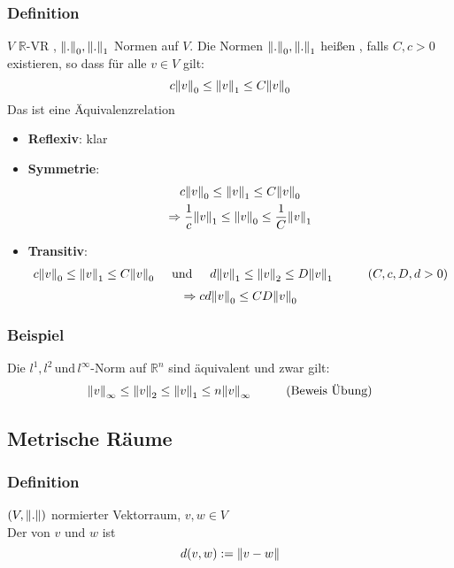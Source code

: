 \subsubsection[Äquivalenz von Normen]{Definition} %
\label{ssub:definition}
$ V$ $\mathbb{R}$-VR , $\norm{.}_0 , \norm{.}_1$ Normen auf $ V$. Die Normen $\norm{.}_0 , \norm{.}_1$ heißen , falls $C,c>0$ existieren, so dass für alle $v \in  V$ gilt:
\[
	c \norm{v}_0 \leq \norm{v}_1 \leq C \norm{v}_0 
\] 
 Das ist eine Äquivalenzrelation
\begin{itemize}
	\item { \bfseries Reflexiv}: klar
	\item { \bfseries Symmetrie}: \begin{gather*}
		c \norm{v}_0 \leq \norm{v}_1 \leq C \norm{v}_0 \\
		\Rightarrow \frac{1}{c} \norm{v}_1 \leq \norm{v}_0 \leq \frac{1}{C} \norm{v}_1
	\end{gather*}
	\item {\bfseries Transitiv}: \begin{gather*}
		c \norm{v}_0 \leq \norm{v}_1 \leq C \norm{v}_0 \hspace{0.5cm} \text{und}\hspace{0.5cm} d \norm{v}_1 \leq \norm{v}_2 \leq D \norm{v}_1  \hspace{1cm} (C,c,D,d > 0)	\end{gather*}
		\[
		\Rightarrow cd \norm{v}_0 \leq CD \norm{v}_0
		\]
\end{itemize}

\subsubsection[Beispiel Äquivalente Normen]{Beispiel} %
\label{ssub:beispiel}
Die $l^1, l^2 \, \text{und} \, l^{\infty}$-Norm auf $\mathbb{R}^n $ sind äquivalent und zwar gilt:
\[
	\norm{v}_{\infty} \leq \norm{v}_2 \leq \norm{v}_1 \leq n \norm{v}_{\infty} \hspace{1cm} \text{(Beweis Übung)}
\]

\subsection{Metrische Räume} %
\label{sub:metrische_raume}

\subsubsection[Abstand]{Definition} %
\label{ssub:definition}
$(V,\norm{.})$ normierter Vektorraum, $v,w \in  V$ \\
Der  von $v$ und $w$ ist \[
d(v,w):= \norm{v-w}	
\] 
